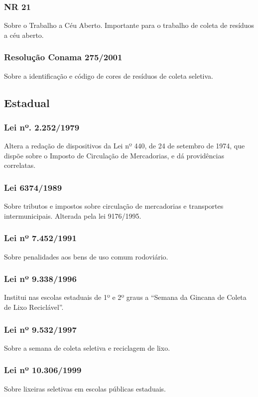 \begin{subapend}
\begin{subsubapend}
		\subsubsection{NR 21}
		Sobre o Trabalho a Céu Aberto. Importante para o trabalho de coleta de resíduos a céu aberto.
		\subsubsection{Resolução Conama 275/2001}
		Sobre a identificação e código de cores de resíduos de coleta seletiva.
	\end{subsubapend}
\end{subapend}

\begin{subapend}
	\subsection{Estadual}
	\begin{subsubapend}
		\item \subsubsection{Lei nº. 2.252/1979}
		Altera a redação de dispositivos da Lei nº 440, de 24 de setembro de 1974, que dispõe sobre o Imposto de Circulação de Mercadorias, e dá providências correlatas.
		\subsubsection{Lei 6374/1989}
		Sobre tributos e impostos sobre circulação de mercadorias e transportes intermunicipais. Alterada pela lei 9176/1995.
		\subsubsection{Lei nº 7.452/1991}
		Sobre penalidades aos bens de uso comum rodoviário.
		\subsubsection{Lei nº 9.338/1996}
		Institui nas escolas estaduais de 1º e 2º graus a “Semana da Gincana de Coleta de Lixo Reciclável”.
		\subsubsection{Lei nº 9.532/1997}
		Sobre a semana de coleta seletiva e reciclagem de lixo.
		\subsubsection{Lei nº 10.306/1999}
		Sobre lixeiras seletivas em escolas públicas estaduais.

\end{subsubapend}
\end{subapend}
